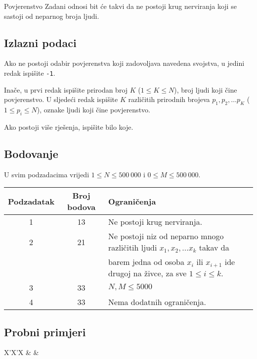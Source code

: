 \begin{statement}[
  problempoints=100,
  timelimit=1 sekunda,
  memorylimit=512 MiB,
]{Povjerenstvo}
Zadani odnosi bit će takvi da ne postoji krug nerviranja koji se sastoji od
neparnog broja ljudi.

\subsection*{Izlazni podaci}

Ako ne postoji odabir povjerenstva koji zadovoljava navedena svojstva, u jedini
redak ispišite \texttt{-1}.

Inače, u prvi redak ispišite prirodan broj $K$ ($1 \leq K \leq N$), broj ljudi
koji čine povjerenstvo. U sljedeći redak ispišite $K$ različitih prirodnih
brojeva $p_1, p_2, \dots p_K$ ($1 \leq p_i \leq N$), oznake ljudi koji čine
povjerenstvo.

Ako postoji više rješenja, ispišite bilo koje.

\subsection*{Bodovanje}

U svim podzadacima vrijedi $1 \leq N \leq 500~000$ i $0 \leq M \leq 500~000$.

{\renewcommand{\arraystretch}{1.4}
  \setlength{\tabcolsep}{6pt}
  \begin{tabular}{ccl}
   Podzadatak & Broj bodova & Ograničenja \\ \midrule
    1 & 13 & Ne postoji krug nerviranja. \\
    2 & 21 & Ne postoji niz od neparno mnogo različitih ljudi $x_1, x_2, \dots x_k$ takav da \\
      &    & barem jedna od osoba $x_i$ ili $x_{i+1}$ ide drugoj na živce, za sve $1 \leq i \leq k$. \\
    3 & 33 & $N, M \leq 5000$ \\
    4 & 33 & Nema dodatnih ograničenja.
\end{tabular}}

\subsection*{Probni primjeri}
\begin{tabularx}{\textwidth}{X'X'X}
 &
 &
\end{tabularx}


\end{statement}
